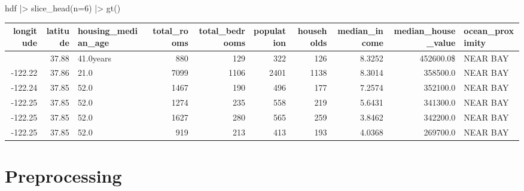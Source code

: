 \documentclass[
  letterpaper,
  DIV=11,
  numbers=noendperiod]{scrreprt}
\newenvironment{Shaded}{\begin{snugshade}}{\end{snugshade}}
\newcommand{\AttributeTok}[1]{\textcolor[rgb]{0.40,0.45,0.13}{#1}}
\newcommand{\CommentTok}[1]{\textcolor[rgb]{0.37,0.37,0.37}{#1}}
\newcommand{\DecValTok}[1]{\textcolor[rgb]{0.68,0.00,0.00}{#1}}
\newcommand{\FunctionTok}[1]{\textcolor[rgb]{0.28,0.35,0.67}{#1}}
\newcommand{\NormalTok}[1]{\textcolor[rgb]{0.00,0.23,0.31}{#1}}
\newcommand{\OtherTok}[1]{\textcolor[rgb]{0.00,0.23,0.31}{#1}}
\newcommand{\SpecialCharTok}[1]{\textcolor[rgb]{0.37,0.37,0.37}{#1}}
\newcommand{\StringTok}[1]{\textcolor[rgb]{0.13,0.47,0.30}{#1}}
\begin{document}
\begin{Shaded}
\begin{Highlighting}[]
\NormalTok{hdf }\SpecialCharTok{|\textgreater{}} 
  \FunctionTok{slice\_head}\NormalTok{(}\AttributeTok{n=}\DecValTok{6}\NormalTok{) }\SpecialCharTok{|\textgreater{}}
  \FunctionTok{gt}\NormalTok{()}
\end{Highlighting}
\end{Shaded}

\begin{table}
\fontsize{12.0pt}{14.4pt}\selectfont
\begin{tabular*}{\linewidth}{@{\extracolsep{\fill}}rrlrrrrrrl}
\toprule
longitude & latitude & housing\_median\_age & total\_rooms & total\_bedrooms & population & households & median\_income & median\_house\_value & ocean\_proximity \\ 
\midrule\addlinespace[2.5pt]
-122.23 & 37.88 & 41.0years & 880 & 129 & 322 & 126 & 8.3252 & 452600.0\$ & NEAR BAY \\ 
-122.22 & 37.86 & 21.0 & 7099 & 1106 & 2401 & 1138 & 8.3014 & 358500.0 & NEAR BAY \\ 
-122.24 & 37.85 & 52.0 & 1467 & 190 & 496 & 177 & 7.2574 & 352100.0 & NEAR BAY \\ 
-122.25 & 37.85 & 52.0 & 1274 & 235 & 558 & 219 & 5.6431 & 341300.0 & NEAR BAY \\ 
-122.25 & 37.85 & 52.0 & 1627 & 280 & 565 & 259 & 3.8462 & 342200.0 & NEAR BAY \\ 
-122.25 & 37.85 & 52.0 & 919 & 213 & 413 & 193 & 4.0368 & 269700.0 & NEAR BAY \\ 
\bottomrule
\end{tabular*}
\end{table}

\section{Preprocessing}\label{preprocessing}

\begin{Shaded}
\end{Shaded}
\end{document}
